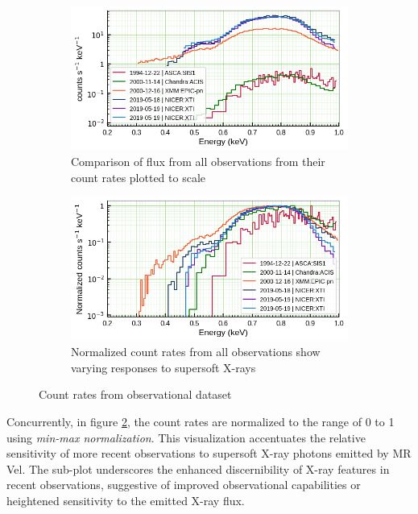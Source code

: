     \begin{figure}[!htb]
        \centering
        \begin{subfigure}[b]{0.45\textwidth}
            \centering
            \includegraphics[width=\textwidth]{figures/ldata/mr-vel-counts_all-obs.png}
            \caption{Comparison of flux from all observations from their count rates plotted to scale}
            \label{fig:all-counts:unnorm}
        \end{subfigure}
        \hfill
        \begin{subfigure}[b]{0.45\textwidth}
            \centering
            \includegraphics[width=\textwidth]{figures/ldata/mr-vel-normcounts_all-obs.png}
            \caption{Normalized count rates from all observations show varying responses to supersoft X-rays}
            \label{fig:all-counts:norm}
        \end{subfigure}
        \caption{Count rates from observational dataset}
        \label{fig:all-counts}
    \end{figure}
    
    Concurrently, in figure \ref{fig:all-counts:norm}, the count rates are normalized to the range of 0 to 1 using \textit{min-max normalization}. This visualization accentuates the relative sensitivity of more recent observations to supersoft X-ray photons emitted by MR Vel. The sub-plot underscores the enhanced discernibility of X-ray features in recent observations, suggestive of improved observational capabilities or heightened sensitivity to the emitted X-ray flux.
    
